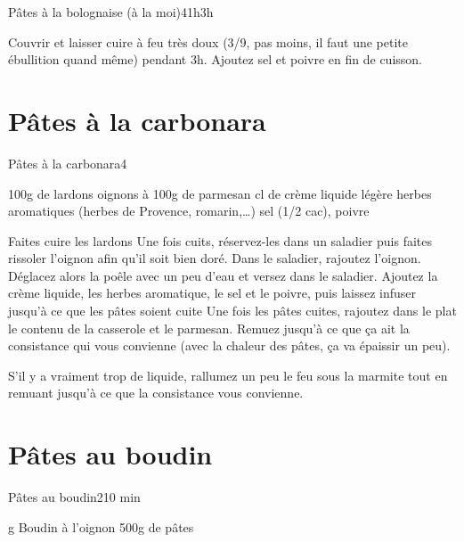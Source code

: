 {\begin{recette}{Pâtes à la bolognaise (à la moi)}{4}{1h}{3h}
\begin{cuisson}
Couvrir et laisser cuire à feu très doux (3/9, pas moins, il faut une petite ébullition quand même) pendant 3h. Ajoutez sel et poivre en fin de cuisson.
\end{cuisson}
\end{recette}\label{sec:bolognaise}

\section{Pâtes à la carbonara}
\begin{recette}{Pâtes à la carbonara}{4}{}{}
\begin{ingredients}
\ingredient 100g de lardons
 oignons
 à 100g de parmesan
 cl de crème liquide légère 
\ingredient herbes aromatiques (herbes de Provence, romarin,\dots)
\ingredient sel (1/2 cac), poivre
\end{ingredients}

\begin{preparation}
\etape Faites cuire les lardons
\etape Une fois cuits, réservez-les dans un saladier puis faites rissoler l'oignon afin qu'il soit bien doré.
\etape Dans le saladier, rajoutez l'oignon. Déglacez alors la poêle avec un peu d'eau et versez dans le saladier.
\etape Ajoutez la crème liquide, les herbes aromatique, le sel et le poivre, puis laissez infuser jusqu'à ce que les pâtes soient cuite
\etape Une fois les pâtes cuites, rajoutez dans le plat le contenu de la casserole et le parmesan. Remuez jusqu'à ce que ça ait la consistance qui vous convienne (avec la chaleur des pâtes, ça va épaissir un peu).
\begin{remarque}
S'il y a vraiment trop de liquide, rallumez un peu le feu sous la marmite tout en remuant jusqu'à ce que la consistance vous convienne.
\end{remarque}
\end{preparation}

\end{recette}

\section{Pâtes au boudin}
\begin{recette}{Pâtes au boudin}{2}{10 min}{}
\begin{ingredients}
 g Boudin à l'oignon
\ingredient 500g de pâtes
\end{ingredients}


\end{recette}}
